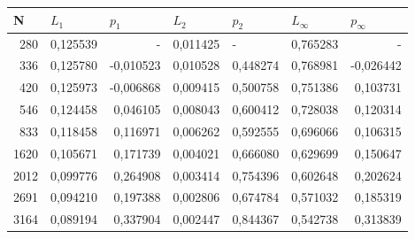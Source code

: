 \documentclass[14pt]{article}
\begin{document}
\begin{table}[!h!]
\begin{tabular}{|r|r|r|r|r|r|r|}
\hline
\multicolumn{1}{|l|}{N} & \multicolumn{1}{l|}{$L_1$}        & \multicolumn{1}{l|}{$p_1$} & \multicolumn{1}{l|}{$L_2$}     & \multicolumn{1}{l|}{$p_2$} & \multicolumn{1}{l|}{$L_\infty$} & \multicolumn{1}{l|}{$p_\infty$} \\ \hline
280                     & 0,125539                      & -                         & 0,011425                      & \multicolumn{1}{l|}{-}    & 0,765283                    & -                           \\ \hline
336                     & 0,125780                      & -0,010523                 & 0,010528                      & 0,448274                  & 0,768981                    & -0,026442                   \\ \hline
420                     & 0,125973                      & -0,006868                 & 0,009415                      & 0,500758                  & 0,751386                    & 0,103731                    \\ \hline
546                     & 0,124458                      & 0,046105                  & 0,008043                      & 0,600412                  & 0,728038                    & 0,120314                    \\ \hline
833                     & 0,118458                      & 0,116971                  & 0,006262                      & 0,592555                  & 0,696066                    & 0,106315                    \\ \hline
1620                    & 0,105671                      & 0,171739                  & 0,004021                      & 0,666080                  & 0,629699                    & 0,150647                    \\ \hline
2012                    & 0,099776                      & 0,264908                  & 0,003414                      & 0,754396                  & 0,602648                    & 0,202624                    \\ \hline
2691                    & 0,094210                      & 0,197388                  & 0,002806                      & 0,674784                  & 0,571032                    & 0,185319                    \\ \hline
3164                    & 0,089194                      & 0,337904                  & 0,002447                      & 0,844367                  & 0,542738                    & 0,313839                    \\ \hline

\end{tabular}
\end{table}
\end{document}
